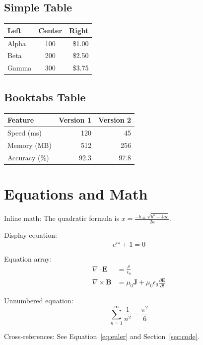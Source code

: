 \documentclass[12pt,twocolumn]{article}
\begin{document}
\subsection{Simple Table}
\begin{tabular}{|l|c|r|}
\hline
Left & Center & Right \\
\hline
Alpha & 100 & \$1.00 \\
Beta & 200 & \$2.50 \\
Gamma & 300 & \$3.75 \\
\hline
\end{tabular}

\subsection{Booktabs Table}
\begin{tabular}{lrr}
\toprule
Feature & Version 1 & Version 2 \\
\midrule
Speed (ms) & 120 & 45 \\
Memory (MB) & 512 & 256 \\
Accuracy (\%) & 92.3 & 97.8 \\
\bottomrule
\end{tabular}

\section{Equations and Math}

Inline math: The quadratic formula is $x = \frac{-b \pm \sqrt{b^2 - 4ac}}{2a}$.

Display equation:
\begin{equation}\label{eq:euler}
e^{i\pi} + 1 = 0
\end{equation}

Equation array:
\begin{align}
\nabla \cdot \mathbf{E} &= \frac{\rho}{\epsilon_0} \label{eq:gauss} \\
\nabla \times \mathbf{B} &= \mu_0 \mathbf{J} + \mu_0 \epsilon_0 \frac{\partial \mathbf{E}}{\partial t}
\end{align}

Unnumbered equation:
\begin{equation*}
\sum_{n=1}^{\infty} \frac{1}{n^2} = \frac{\pi^2}{6}
\end{equation*}

Cross-references: See Equation~\eqref{eq:euler} and Section~\ref{sec:code}.

\end{document}
